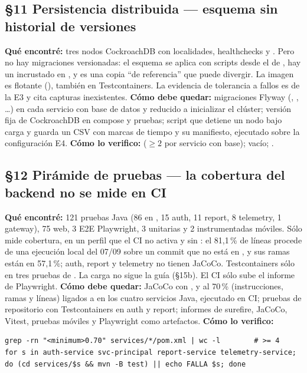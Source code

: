 \subsection*{\S11 Persistencia distribuida --- esquema sin historial de versiones}
\textbf{Qu\'e encontr\'e:} tres nodos CockroachDB con localidades, healthchecks y . Pero no hay migraciones versionadas: el esquema se aplica con scripts  desde el  de , hay un  incrustado en , y  es una copia ``de referencia'' que puede divergir. La imagen es flotante (), tambi\'en en Testcontainers. La evidencia de tolerancia a fallos es de la E3 y cita capturas inexistentes. \textbf{C\'omo debe quedar:} migraciones Flyway (, , \ldots) en cada servicio con base de datos y  reducido a inicializar el cl\'uster; versi\'on fija de CockroachDB en compose y pruebas; script que detiene un nodo bajo carga y guarda un CSV con marcas de tiempo y su manifiesto, ejecutado sobre la configuraci\'on E4. \textbf{C\'omo lo verifico:}  ($\ge 2$ por servicio con base);  vac\'io; .

\subsection*{\S12 Pir\'amide de pruebas --- la cobertura del backend no se mide en CI}
\textbf{Qu\'e encontr\'e:} 121 pruebas Java (86 en , 15 auth, 11 report, 8 telemetry, 1 gateway), 75 web, 3 E2E Playwright, 3 unitarias y 2 instrumentadas m\'oviles. S\'olo  mide cobertura, en un perfil que el CI no activa y sin : el 81,1\,\% de l\'ineas procede de una ejecuci\'on local del 07/09 sobre un commit que no est\'a en , y sus ramas est\'an en 57,1\,\%; auth, report y telemetry no tienen JaCoCo. Testcontainers s\'olo en tres pruebas de . La carga no sigue la gu\'ia (\S15b). El CI s\'olo sube el informe de Playwright. \textbf{C\'omo debe quedar:} JaCoCo con ,  y  al 70\,\% (instrucciones, ramas y l\'ineas) ligados a  en los cuatro servicios Java, ejecutado en CI; pruebas de repositorio con Testcontainers en auth y report; informes de surefire, JaCoCo, Vitest, pruebas m\'oviles y Playwright como artefactos. \textbf{C\'omo lo verifico:}\begin{verbatim}
grep -rn "<minimum>0.70" services/*/pom.xml | wc -l        # >= 4
for s in auth-service svc-principal report-service telemetry-service; do (cd services/$s && mvn -B test) || echo FALLA $s; done
\end{verbatim}

